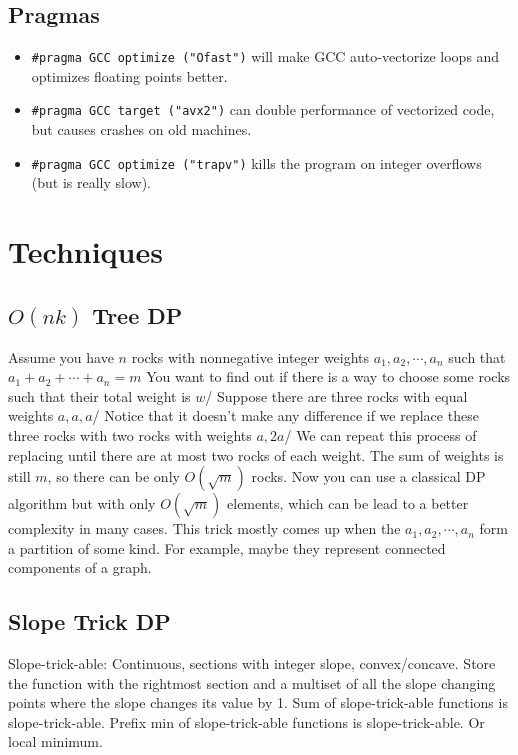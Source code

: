 	\subsection{Pragmas}
		\begin{itemize}
			\item \lstinline{#pragma GCC optimize ("Ofast")} will make GCC auto-vectorize loops and optimizes floating points better.
			\item \lstinline{#pragma GCC target ("avx2")} can double performance of vectorized code, but causes crashes on old machines.
			\item \lstinline{#pragma GCC optimize ("trapv")} kills the program on integer overflows (but is really slow).
		\end{itemize}
\section{Techniques}

\subsection{$O(nk)$ Tree DP}
Assume you have $n$ rocks with nonnegative integer weights $a_1,a_2,\cdots,a_n$ such that $a_1+a_2+\cdots+a_n=m$
You want to find out if there is a way to choose some rocks such that their total weight is $w$/
Suppose there are three rocks with equal weights $a,a,a$/
Notice that it doesn't make any difference if we replace these three rocks with two rocks with weights $a,2a$/
We can repeat this process of replacing until there are at most two rocks of each weight. The sum of weights is still $m$,
so there can be only $O(\sqrt{m})$ rocks. Now you can use a classical DP algorithm but with only $O(\sqrt{m})$
elements, which can be lead to a better complexity in many cases.
This trick mostly comes up when the $a_1,a_2,\cdots,a_n$ form a partition of some kind. 
For example, maybe they represent connected components of a graph.
\subsection{Slope Trick DP}
Slope-trick-able: Continuous, sections with integer slope, convex/concave.
Store the function with the rightmost section and a multiset of all the slope changing points where the slope changes its value by 1.
Sum of slope-trick-able functions is slope-trick-able.
Prefix min of slope-trick-able functions is slope-trick-able. Or local minimum.
